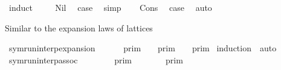 \begin{isabellebody}
%
\isadelimproof
%
\endisadelimproof
%
\isatagproof
{}\isamarkupfalse%
\ {\isacharparenleft}induct\ {\isasymGamma}{\isacharparenright}\isanewline
\ \ \isamarkupfalse%
\ Nil\ \isamarkupfalse%
\ {\isacharquery}case\ \isamarkupfalse%
\ simp\isanewline
{}\isamarkupfalse%
\isanewline
\ \ \isamarkupfalse%
\ Cons\ \isamarkupfalse%
\ {\isacharquery}case\ \isamarkupfalse%
\ auto\isanewline
{}\isamarkupfalse%
%
\endisatagproof
{\isafoldproof}%
%
\isadelimproof
%
\endisadelimproof
%
\isadelimdocument
%
\endisadelimdocument
%
\isatagdocument
%
\isamarkuptrue%
%
\endisatagdocument
{\isafolddocument}%
%
\isadelimdocument
%
\endisadelimdocument
%
\begin{isamarkuptext}%
Similar to the expansion laws of lattices%
\end{isamarkuptext}\isamarkuptrue%
\isamarkupfalse%
\ symrun{\isacharunderscore}interp{\isacharunderscore}expansion{\isacharcolon}\isanewline
\ \ {\isacartoucheopen}{\isasymlbrakk}{\isasymlbrakk}\ {\isasymGamma}\ {\isacharat}\ {\isasymGamma}\ {\isasymrbrakk}{\isasymrbrakk}\isactrlsub p\isactrlsub r\isactrlsub i\isactrlsub m\ {\isacharequal}\ {\isasymlbrakk}{\isasymlbrakk}\ {\isasymGamma}\ {\isasymrbrakk}{\isasymrbrakk}\isactrlsub p\isactrlsub r\isactrlsub i\isactrlsub m\ {\isasyminter}\ {\isasymlbrakk}{\isasymlbrakk}\ {\isasymGamma}\ {\isasymrbrakk}{\isasymrbrakk}\isactrlsub p\isactrlsub r\isactrlsub i\isactrlsub m{\isacartoucheclose}\isanewline
%
\isadelimproof
%
\endisadelimproof
%
\isatagproof
{}\isamarkupfalse%
\ {\isacharparenleft}induction\ {\isasymGamma}\ auto{\isacharparenright}%
\endisatagproof
{\isafoldproof}%
%
\isadelimproof
%
\endisadelimproof
%
\isadelimdocument
%
\endisadelimdocument
%
\isatagdocument
%
\isamarkuptrue%
%
\isamarkuptrue%
%
\endisatagdocument
{\isafolddocument}%
%
\isadelimdocument
%
\endisadelimdocument
{}\isamarkupfalse%
\ symrun{\isacharunderscore}interp{\isacharunderscore}assoc{\isacharcolon}\isanewline
\ \ {\isacartoucheopen}{\isasymlbrakk}{\isasymlbrakk}\ {\isacharparenleft}{\isasymGamma}\ {\isacharat}\ {\isasymGamma}\ {\isacharat}\ {\isasymGamma}\ {\isasymrbrakk}{\isasymrbrakk}\isactrlsub p\isactrlsub r\isactrlsub i\isactrlsub m\ {\isacharequal}\ {\isasymlbrakk}{\isasymlbrakk}\ {\isasymGamma}\ {\isacharat}\ {\isacharparenleft}{\isasymGamma}\ {\isacharat}\ {\isasymGamma}\ {\isasymrbrakk}{\isasymrbrakk}\isactrlsub p\isactrlsub r\isactrlsub i\isactrlsub m{\isacartoucheclose}\isanewline

\end{isabellebody}
